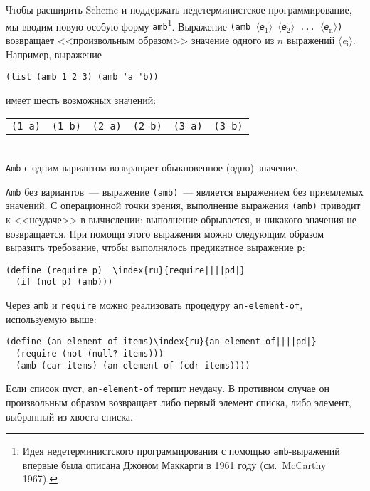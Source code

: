 Чтобы расширить Scheme и поддержать недетерминистское
программирование, мы вводим новую особую форму
{\tt amb}\footnote{Идея недетерминистского
  программирования с помощью {\tt amb}-выражений впервые была описана
  Джоном Маккарти в 1961 году (см.~McCarthy 1967).}.
Выражение 
{\tt (amb \textit{$\langle$e${}_{\mbox{1}}$$\rangle$} \textit{$\langle$e${}_{\mbox{2}}$$\rangle$} ... \textit{$\langle$e${}_{\mbox{n}}$$\rangle$})}
возвращает <<произвольным образом>> значение одного из 
$n$ выражений \textit{$\langle$e${}_{\mbox{i}}$$\rangle$}.
Например, выражение

\begin{Verbatim}[fontsize=\small]
(list (amb 1 2 3) (amb 'a 'b))
\end{Verbatim}
имеет шесть возможных значений:

\begin{tabular}{llllll}
{\tt (1 a)} & {\tt (1 b)} & {\tt (2 a)} & {\tt (2 b)} & {\tt (3 a)} & {\tt (3 b)}
\end{tabular}\\
{\tt Amb} с одним вариантом возвращает обыкновенное (одно)
значение.

{\tt Amb} без вариантов~--- выражение
{\tt (amb)}~--- является выражением без приемлемых значений.
С операционной точки зрения, выполнение выражения {\tt (amb)} приводит к
<<неудаче>> в вычислении:
выполнение обрывается, и никакого значения не 
возвращается.  При помощи этого выражения можно следующим образом
выразить требование, чтобы выполнялось предикатное выражение
{\tt p}:

\begin{Verbatim}[fontsize=\small]
(define (require p)  \index{ru}{require||||pd|}
  (if (not p) (amb)))
\end{Verbatim}

Через {\tt amb} и {\tt require} можно
реализовать процедуру {\tt an-element-of}, используемую выше:

\begin{Verbatim}[fontsize=\small]
(define (an-element-of items)\index{ru}{an-element-of||||pd|}
  (require (not (null? items)))
  (amb (car items) (an-element-of (cdr items))))
\end{Verbatim}
Если список пуст, {\tt an-element-of} терпит неудачу.  В
противном случае он произвольным образом возвращает либо первый элемент
списка, либо элемент, выбранный из хвоста списка.

